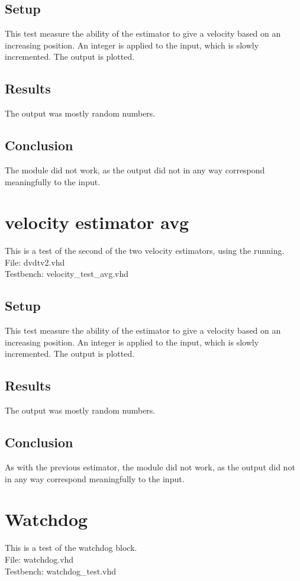 \subsection*{Setup}
This test measure the ability of the estimator to give a velocity based on an increasing position.
An integer is applied to the input, which is slowly incremented. The output is plotted.
\subsection*{Results}
The output was mostly random numbers.
\subsection*{Conclusion}
The module did not work, as the output did not in any way correspond meaningfully to the input.

\section{velocity estimator avg}
This is a test of the second of the two velocity estimators, using the running.\\
File: dvdtv2.vhd\\
Testbench: velocity\_test\_avg.vhd
\subsection*{Setup}
This test measure the ability of the estimator to give a velocity based on an increasing position.
An integer is applied to the input, which is slowly incremented. The output is plotted.
\subsection*{Results}
The output was mostly random numbers.
\subsection*{Conclusion}
As with the previous estimator, the module did not work, as the output did not in any way correspond meaningfully to the input.

\section{Watchdog}
This is a test of the watchdog block.\\
File: watchdog.vhd\\
Testbench: watchdog\_test.vhd
